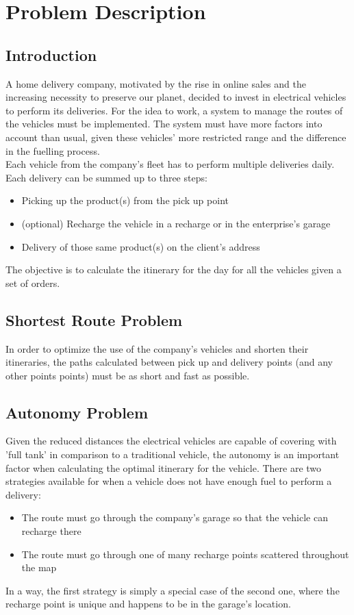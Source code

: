 \chapter{Problem Description}


\section{Introduction}
A home delivery company, motivated by the rise in online sales and the increasing necessity to preserve our planet, decided to invest in electrical vehicles to perform its deliveries. For the idea to work, a system to manage the routes of the vehicles must be implemented. The system must have more factors into account than usual, given these vehicles' more restricted range and the difference in the fuelling process.\\

Each vehicle from the company's fleet has to perform multiple deliveries daily. Each delivery can be summed up to three steps:
\begin{itemize}
	\item Picking up the product(s) from the pick up point
	\item (optional) Recharge the vehicle in a recharge  or in the enterprise's garage
	\item Delivery of those same product(s) on the client's address
\end{itemize}

The objective is to calculate the itinerary for the day for all the vehicles given a set of orders.


\section{Shortest Route Problem}
In order to optimize the use of the company's vehicles and shorten their itineraries, the paths calculated between pick up and delivery points (and any other points points) must be as short and fast as possible.  


\section{Autonomy Problem}
Given the reduced distances the electrical vehicles are capable of covering with 'full tank' in comparison to a traditional vehicle, the autonomy is an important factor when calculating the optimal itinerary for the vehicle. There are two strategies available for when a vehicle does not have enough fuel to perform a delivery:
\begin{itemize}
    \item The route must go through the company's  garage so that the vehicle can recharge there
    \item The route must go through one of many recharge points scattered throughout the map
\end{itemize}
In a way, the first strategy is simply a special case of the second one, where the recharge point is unique and happens to be in the garage's location.


